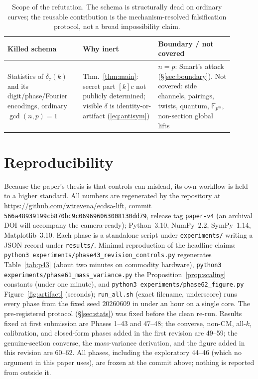 \documentclass[11pt]{article}
\theoremstyle{definition}
\begin{document}
\begin{table}[t]
\centering
\small
\begin{tabular}{p{0.30\linewidth}p{0.30\linewidth}p{0.30\linewidth}}
\toprule
Killed schema & Why inert & Boundary / not covered\\
\midrule
Statistics of $\delta_\tau(k)$ and its digit/phase/Fourier encodings,
ordinary $\gcd(n,p)=1$ &
Thm.~\ref{thm:main}: secret part $[k]c$ not publicly determined; visible
$\delta$ is identity-or-artifact (\eqref{eq:antisym}) &
$n=p$: Smart's attack (\S\ref{sec:boundary}). Not covered: side
channels, pairings, twists, quantum, $\mathbb F_{p^m}$, non-section
global lifts\\
\bottomrule
\end{tabular}
\caption{Scope of the refutation. The schema is structurally dead on
ordinary curves; the reusable contribution is the mechanism-resolved
falsification protocol, not a broad impossibility claim.}
\label{tab:scope}
\end{table}

\section{Reproducibility}\label{sec:repro}

Because the paper's thesis is that controls can mislead, its own workflow
is held to a higher standard. All numbers are regenerated by the
repository at \url{https://github.com/wtrevena/ecdsa-lift}, commit
\texttt{566a48939199cb870bc9c069696063008130dd79}, release tag
\texttt{paper-v4} (an archival DOI will accompany the camera-ready);
Python~3.10, NumPy~2.2, SymPy~1.14, Matplotlib~3.10. Each phase is a
standalone script under \texttt{experiments/} writing a JSON record under
\texttt{results/}. Minimal reproduction of the headline claims:
\texttt{python3 experiments/phase43\_revision\_controls.py} regenerates
Table~\ref{tab:p43} (about two minutes on commodity hardware),
\texttt{python3 experiments/phase61\_mass\_variance.py} the
Proposition~\ref{prop:scaling} constants (under one minute), and
\texttt{python3 experiments/phase62\_figure.py}
Figure~\ref{fig:artifact} (seconds); \texttt{run\_all.sh} (exact
filename, underscore) runs every phase from the fixed seed $20260609$ in
under an hour on a single core. The pre-registered protocol
(\S\ref{sec:stats}) was fixed before the clean re-run. Results fixed at
first submission are Phases 1--43 and 47--48; the converse, non-CM,
all-$k$, calibration, and closed-form phases added in the first revision
are 49--59; the genuine-section converse, the mass-variance derivation,
and the figure added in this revision are 60--62. All phases, including
the exploratory 44--46 (which no argument in this paper uses), are frozen
at the commit above; nothing is reported from outside it.
\end{document}
